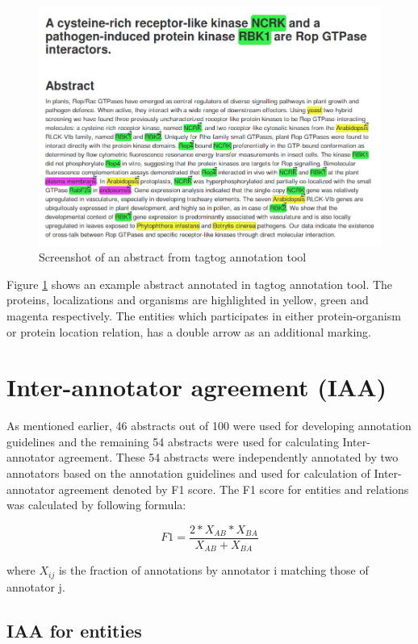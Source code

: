 \begin{figure}[hbtp]
\includegraphics[scale=0.4]{figures/tagtog_screenshot.png}
\caption{Screenshot of an abstract from tagtog annotation tool}\label{tagtogScreenshot}
\end{figure}

Figure \ref{tagtogScreenshot} shows an example abstract annotated in tagtog annotation tool. The proteins, localizations and organisms are highlighted in yellow, green and magenta respectively. The entities which participates in either protein-organism or protein location relation, has a double arrow as an additional marking.

\section{Inter-annotator agreement (IAA)}

As mentioned earlier, 46 abstracts out of 100 were used for developing annotation guidelines and the remaining 54 abstracts were used for calculating Inter-annotator agreement. These 54 abstracts were independently annotated by two annotators based on the annotation guidelines and used for calculation of Inter-annotator agreement denoted by F1 score. The F1 score for entities and relations was calculated by following formula:

$$
F1 = \frac{2*X_{AB}*X_{BA}}{X_{AB}+X_{BA}}
$$

where $X_{ij}$ is the fraction of annotations by annotator i matching those of annotator j.

\subsection*{IAA for entities}

